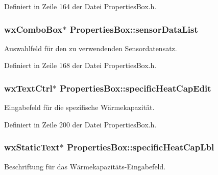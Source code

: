 Definiert in Zeile 164 der Datei Properties\-Box.\-h.

\hypertarget{classPropertiesBox_afc9329945c39f48e441c410b0ff3d9fa}{
\subsubsection[{sensor\-Data\-List}]{\setlength{\rightskip}{0pt plus 5cm}wx\-Combo\-Box$\ast$ Properties\-Box\-::sensor\-Data\-List\hspace{0.3cm}{\ttfamily [private]}}}\label{classPropertiesBox_afc9329945c39f48e441c410b0ff3d9fa}
Auswahlfeld für den zu verwendenden Sensordatensatz. 

Definiert in Zeile 168 der Datei Properties\-Box.\-h.

\hypertarget{classPropertiesBox_a7058b344520a2d9ba42fe9e9c1080faa}{
\subsubsection[{specific\-Heat\-Cap\-Edit}]{\setlength{\rightskip}{0pt plus 5cm}wx\-Text\-Ctrl$\ast$ Properties\-Box\-::specific\-Heat\-Cap\-Edit\hspace{0.3cm}{\ttfamily [private]}}}\label{classPropertiesBox_a7058b344520a2d9ba42fe9e9c1080faa}
Eingabefeld für die spezifische Wärmekapazität. 

Definiert in Zeile 200 der Datei Properties\-Box.\-h.

\hypertarget{classPropertiesBox_ad49b95cb856e5f18d6717fc99ccd7b0b}{
\subsubsection[{specific\-Heat\-Cap\-Lbl}]{\setlength{\rightskip}{0pt plus 5cm}wx\-Static\-Text$\ast$ Properties\-Box\-::specific\-Heat\-Cap\-Lbl\hspace{0.3cm}{\ttfamily [private]}}}\label{classPropertiesBox_ad49b95cb856e5f18d6717fc99ccd7b0b}
Beschriftung für das Wärmekapazitäts-\/\-Eingabefeld. 

